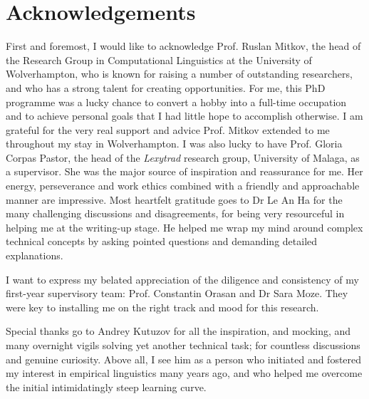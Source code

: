 
\chapter*{Acknowledgements}


First and foremost, I would like to acknowledge Prof. Ruslan Mitkov, the head of the Research Group in Computational Linguistics at the University of Wolverhampton, who is known for raising a number of outstanding researchers, and who has a strong talent for creating opportunities. For me, this PhD programme was a lucky chance to convert a hobby into a full-time occupation and to achieve personal goals that I had little hope to accomplish otherwise. I am grateful for the very real support and advice Prof. Mitkov extended to me throughout my stay in Wolverhampton. %
I was also lucky to have Prof. Gloria Corpas Pastor, the head of the \textit{Lexytrad} research group, University of Malaga, as a supervisor. She was the major source of inspiration and reassurance for me. Her energy, perseverance and work ethics combined with a friendly and approachable manner are impressive. 
Most heartfelt gratitude goes to Dr Le An Ha for the many challenging discussions and disagreements, for being very resourceful in helping me at the writing-up stage. He helped me wrap my mind around complex technical concepts by asking pointed questions and demanding detailed explanations. 

I want to express my belated appreciation of the diligence and consistency of my first-year supervisory team: Prof. Constantin Orasan and Dr Sara Moze. They were key to installing me on the right track and mood for this research. 

Special thanks go to Andrey Kutuzov for all the inspiration, and mocking, and many overnight vigils solving yet another technical task; for countless discussions and genuine curiosity. Above all, I see him as a person who initiated and fostered my interest in empirical linguistics many years ago, and who helped me overcome the initial intimidatingly steep learning curve.

